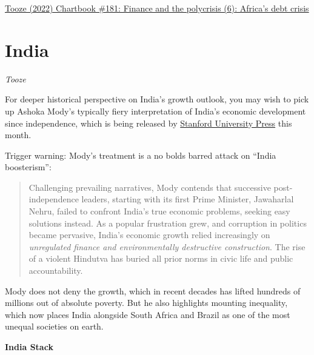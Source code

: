 \documentclass[
]{book}
\begin{document}
\href{https://adamtooze.substack.com/p/finance-and-the-polycrisis-6-africas}{Tooze (2022) Chartbook \#181: Finance and the polycrisis (6): Africa's debt crisis}

\hypertarget{india}{%
\section{India}\label{india}}

\emph{Tooze}

For deeper historical perspective on India's growth outlook, you may wish to pick up Ashoka Mody's typically fiery interpretation of India's economic development since independence, which is being released by \href{https://www.sup.org/books/title/?id=34425}{Stanford University Press} this month.

Trigger warning: Mody's treatment is a no bolds barred attack on ``India boosterism'':

\begin{quote}
Challenging prevailing narratives, Mody contends that successive post-independence leaders, starting with its first Prime Minister, Jawaharlal Nehru, failed to confront India's true economic problems, seeking easy solutions instead. As a popular frustration grew, and corruption in politics became pervasive, India's economic growth relied increasingly on \emph{unregulated finance and environmentally destructive construction}. The rise of a violent Hindutva has buried all prior norms in civic life and public accountability.
\end{quote}

Mody does not deny the growth, which in recent decades has lifted hundreds of millions out of absolute poverty. But he also highlights mounting inequality, which now places India alongside South Africa and Brazil as one of the most unequal societies on earth.

\textbf{India Stack}
\end{document}
